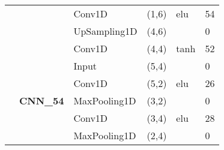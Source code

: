 \begin{table}[H]
\begin{center}
\begin{tabular}{ll|l|l|l|l|}
\multicolumn{1}{|l|}{}                                                                  &                                   & Conv1D                             & (1,6)                                & elu                                     & 54                                          \\ \cline{3-6} 
\multicolumn{1}{|l|}{}                                                                  &                                   & UpSampling1D                       & (4,6)                                &                                          & 0                                           \\ \cline{3-6} 
\multicolumn{1}{|l|}{}                                                                  &                                   & Conv1D                             & (4,4)                                & tanh                                     & 52                                          \\ \cline{2-6} 
\multicolumn{1}{|l|}{}                                                                  & \multirow{8}{*}{\textbf{CNN\_54}} & Input                              & (5,4)                                &                                          & 0                                           \\ \cline{3-6} 
\multicolumn{1}{|l|}{}                                                                  &                                   & Conv1D                             & (5,2)                                & elu                                     & 26                                          \\ \cline{3-6} 
\multicolumn{1}{|l|}{}                                                                  &                                   & MaxPooling1D                       & (3,2)                                &                                          & 0                                           \\ \cline{3-6} 
\multicolumn{1}{|l|}{}                                                                  &                                   & Conv1D                             & (3,4)                                & elu                                     & 28                                          \\ \cline{3-6} 
\multicolumn{1}{|l|}{}                                                                  &                                   & MaxPooling1D                       & (2,4)                                &                                          & 0                                           \\ \cline{3-6} 

\end{tabular}
\end{center}
\end{table}
